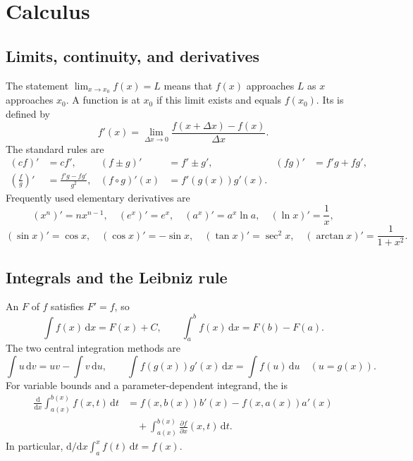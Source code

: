\section{Calculus}

\subsection{Limits, continuity, and derivatives}

The statement $\lim_{x\to x_0}f(x)=L$ means that $f(x)$ approaches $L$ as $x$ approaches $x_0$. A function is  at $x_0$ if this limit exists and equals $f(x_0)$. Its  is defined by
\begin{equation}
f'(x)=\lim_{\Delta x\to0}\frac{f(x+\Delta x)-f(x)}{\Delta x}.
\end{equation}
The standard rules are
\begin{align}
(cf)'&=cf', & (f\pm g)'&=f'\pm g', & (fg)'&=f'g+fg',\\
\left(\frac{f}{g}\right)'&=\frac{f'g-fg'}{g^2}, & (f\circ g)'(x)&=f'(g(x))g'(x).
\end{align}
Frequently used elementary derivatives are
\begin{equation}
(x^n)'=nx^{n-1},\quad (e^x)'=e^x,\quad (a^x)'=a^x\ln a,\quad (\ln x)'=\frac1x,
\end{equation}
\begin{equation}
(\sin x)'=\cos x,\quad (\cos x)'=-\sin x,\quad (\tan x)'=\sec^2x,\quad (\arctan x)'=\frac{1}{1+x^2}.
\end{equation}

\subsection{Integrals and the Leibniz rule}

An  $F$ of $f$ satisfies $F'=f$, so
\begin{equation}
\int f(x)\,\mathrm{d}x=F(x)+C,
\qquad
\int_a^b f(x)\,\mathrm{d}x=F(b)-F(a).
\end{equation}
The two central integration methods are
\begin{equation}
\int u\,\mathrm{d}v=uv-\int v\,\mathrm{d}u,
\qquad
\int f(g(x))g'(x)\,\mathrm{d}x=\int f(u)\,\mathrm{d}u\quad(u=g(x)).
\end{equation}
For variable bounds and a parameter-dependent integrand, the  is
\begin{align}
\frac{\mathrm{d}}{\mathrm{d}x}\int_{a(x)}^{b(x)}f(x,t)\,\mathrm{d}t
&=f(x,b(x))b'(x)-f(x,a(x))a'(x)\nonumber\\
&\quad+\int_{a(x)}^{b(x)}\frac{\partial f}{\partial x}(x,t)\,\mathrm{d}t.
\end{align}
In particular, $\mathrm{d}/\mathrm{d}x\int_a^x f(t)\,\mathrm{d}t=f(x)$.

